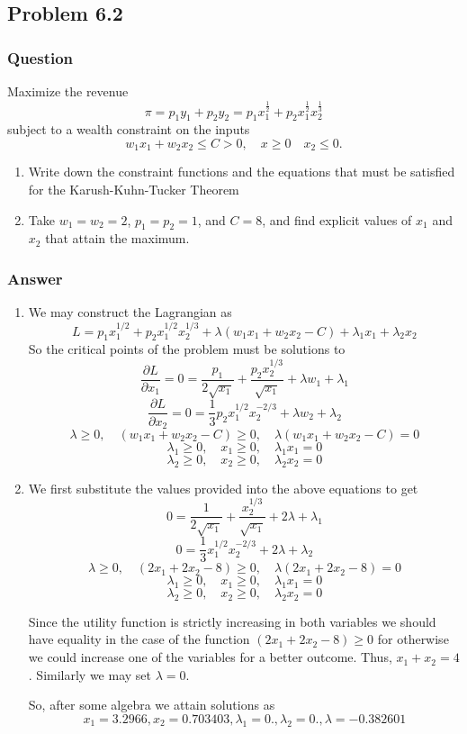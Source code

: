 \documentclass[12pt]{article}
\begin{document}
\subsection{Problem 6.2}
\subsubsection{Question}
Maximize the revenue
\[\pi = p_1 y_1 +p_2 y_2 = p_1 x_1^{\frac{1}{2}}+p_2 x_1^{\frac{1}{2}}x_2^{\frac{1}{3}}\]
subject to a wealth constraint on the inputs
\[ w_1 x_1 +w_2x_2 \leq C >0, \quad x\geq 0 \quad x_2\leq 0.\]
\begin{enumerate}
\item Write down the constraint functions and the equations that must be satisfied for the Karush-Kuhn-Tucker Theorem
\item Take $w_1=w_2=2$, $p_1=p_2=1$, and $C=8$, and find explicit values of $x_1$ and $x_2$ that attain the maximum.
\end{enumerate}

\subsubsection{Answer}
\begin{enumerate}
\item We may construct the Lagrangian as 
\[L= p_1 x_1^{1/2}+p_2 x_1^{1/2}x_2^{1/3} + \lambda \left( w_1 x_1 + w_2 x_2 - C \right) + \lambda_1x_1+\lambda_2 x_2\]
So the critical points of the problem must be solutions to
\[\frac{\partial L}{\partial x_1} = 0 = \frac{p_1}{2\sqrt{x_1}}+ \frac{p_2 x_2^{1/3}}{\sqrt{x_1}} + \lambda w_1+ \lambda_1\]
\[\frac{\partial L}{\partial x_2} = 0= \frac{1}{3}p_2x_1^{1/2}x_2^{-2/3} +\lambda w_2 + \lambda_2\]
\[\lambda \geq 0,\quad \left( w_1 x_1 + w_2 x_2 - C  \right)\geq 0,\quad \lambda \left( w_1 x_1 + w_2 x_2 - C  \right) = 0\]
\[\lambda_1 \geq 0, \quad x_1 \geq 0,  \quad \lambda_1 x_1 = 0\]
\[\lambda_2 \geq 0, \quad x_2 \geq 0,  \quad \lambda_2 x_2 = 0\]

\item We first substitute the values provided into the above equations to get
\[0 = \frac{1}{2\sqrt{x_1}}+ \frac{ x_2^{1/3}}{\sqrt{x_1}} +2 \lambda + \lambda_1\]
\[0= \frac{1}{3}x_1^{1/2}x_2^{-2/3} + 2 \lambda +\lambda_2\]
\[\lambda \geq 0,\quad \left( 2 x_1 + 2 x_2 - 8  \right)\geq 0,\quad \lambda \left( 2 x_1 + 2 x_2 - 8  \right) = 0\]
\[\lambda_1 \geq 0, \quad x_1 \geq 0,  \quad \lambda_1 x_1 = 0\]
\[\lambda_2 \geq 0, \quad x_2 \geq 0,  \quad \lambda_2 x_2 = 0\]

Since the utility function is strictly increasing in both variables we should have equality in the case of the function $ \left( 2 x_1 + 2 x_2 - 8  \right)\geq 0$ for otherwise we could increase one of the variables for a better outcome. Thus, $x_1+x_2=4$. Similarly we may set $\lambda = 0$.

So, after some algebra we attain solutions as
\[x_1= 3.2966,x_2= 0.703403,\lambda_1= 0.,\lambda_2= 0.,\lambda =  -0.382601\]

\end{enumerate}
\end{document}
